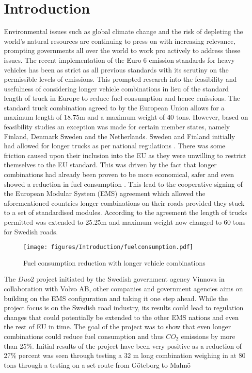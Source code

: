 \documentclass[MastersThesis.tex]{subfiles}
\begin{document}
\chapter{Introduction}
	Environmental issues such as global climate change and the risk of depleting the world's natural resources are continuing to press on with increasing relevance, prompting governments all over the world to work pro actively to address these issues. The recent implementation of the Euro 6 emission standards for heavy vehicles has been as strict as all previous standards with its scrutiny on the permissible levels of emissions. This prompted research into the feasibility and usefulness of considering longer vehicle combinations in lieu of the standard length of truck in Europe to reduce fuel consumption and hence emissions. The standard truck combination agreed to by the European Union allows for a maximum length of 18.75m and a maximum weight of 40 tons. However, based on feasibility studies an exception was made for certain member states, namely Finland, Denmark Sweden and the Netherlands. Sweden and Finland initially had allowed for longer trucks as per national regulations \cite{Davidsson11}. There was some friction caused upon their inclusion into the EU as they were unwilling to restrict themselves to the EU standard. This was driven by the fact that longer combinations had already been proven to be more economical, safer and even showed a reduction in fuel consumption \cite{SNRTRI08}. This lead to the cooperative signing of the European Modular System (EMS) agreement which allowed the aforementioned countries longer combinations on their roads provided they stuck to a set of standardised modules. According to the agreement the length of trucks permitted was extended to 25.25m and maximum weight now changed to 60 tons for Swedish roads.\cite{SNRTRI08}\\

	\begin{figure}[ht!]
		\begin{center}
			\texttt{[image: figures/Introduction/fuelconsumption.pdf]}
		\end{center}
		\caption{Fuel consumption reduction with longer vehicle combinations}
		\label{fig:fuelconsumptionred}
	\end{figure}

	The $Duo2$ project initiated by the Swedish government agency Vinnova in collaboration with Volvo AB, other companies and government agencies aims on building on the EMS configuration and taking it one step ahead. While the project focus is on the Swedish road industry, its results could lead to regulation changes that could potentially be extended to the other EMS nations and even the rest of EU in time. The goal of the project was to show that even longer combinations could reduce fuel consumption and thus $CO_2$ emissions by more than 25\%. Initial results of the project have been very positive as a reduction of 27\% percent was seen through testing a 32 m long combination weighing in at 80 tons through a testing on a set route from G\"oteborg to Malm\"o \cite{Cider13}
\end{document}
